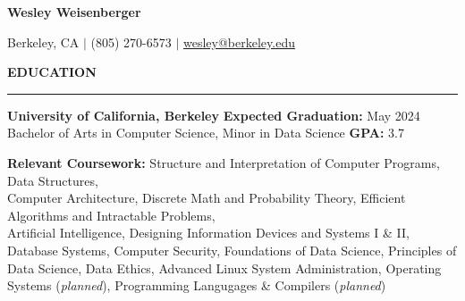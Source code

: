 \documentclass{article}
\begin{document}
\pagestyle{fancy}
\fancyhead{}\fancyfoot{}

    \newcommand{\header}[1]{ 
        \vspace{4mm}
        {\large \noindent \textbf{#1}}
        \vspace{1.5mm}
        \hrule
        \vspace{2mm}
    }

    \begin{center}
        
        {\LARGE \textbf{Wesley Weisenberger}}
    
        \vspace{2mm}

        {\large Berkeley, CA  $\mid$ (805) 270-6573 
            $\mid$
            \href{mailto:wesley@berkeley.edu}{wesley@berkeley.edu}

        }

    \end{center}

    
    \header{EDUCATION}

        \begin{adjustwidth}{1em}{1em}

            \textbf{University of California, Berkeley} 
            \hfill 
            \textbf{Expected Graduation:} May 2024 \\
            Bachelor of Arts in Computer Science, Minor in Data Science \hfill  \textbf{GPA:} 3.7

            \vspace{2.5mm}

            \textbf{Relevant Coursework:}
                Structure and Interpretation of Computer Programs, 
                Data Structures, \\
                Computer Architecture,
                Discrete Math and Probability Theory, 
                Efficient Algorithms and Intractable Problems, \\
                Artificial Intelligence,
                Designing Information Devices and Systems I \& II,
                Database Systems, 
                Computer Security,
                Foundations of Data Science,
                Principles of Data Science,
                Data Ethics, 
                Advanced Linux System Administration,
                Operating Systems (\textit{planned}),
                Programming Langugages \& Compilers (\textit{planned})

        \end{adjustwidth}
\end{document}
